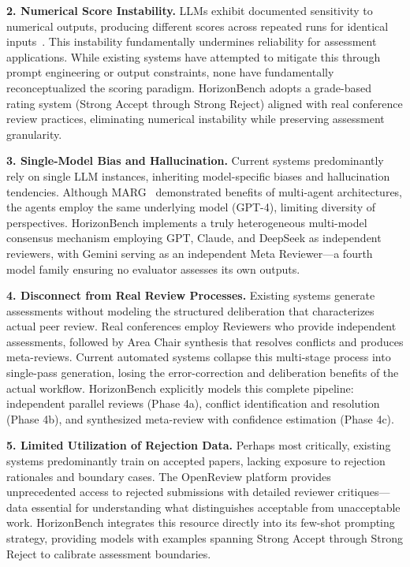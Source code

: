 \textbf{2. Numerical Score Instability.} LLMs exhibit documented sensitivity to numerical outputs, producing different scores across repeated runs for identical inputs~\cite{zhou2024llm}. This instability fundamentally undermines reliability for assessment applications. While existing systems have attempted to mitigate this through prompt engineering or output constraints, none have fundamentally reconceptualized the scoring paradigm. HorizonBench adopts a grade-based rating system (Strong Accept through Strong Reject) aligned with real conference review practices, eliminating numerical instability while preserving assessment granularity.

\textbf{3. Single-Model Bias and Hallucination.} Current systems predominantly rely on single LLM instances, inheriting model-specific biases and hallucination tendencies. Although MARG~\cite{darcy2024marg} demonstrated benefits of multi-agent architectures, the agents employ the same underlying model (GPT-4), limiting diversity of perspectives. HorizonBench implements a truly heterogeneous multi-model consensus mechanism employing GPT, Claude, and DeepSeek as independent reviewers, with Gemini serving as an independent Meta Reviewer—a fourth model family ensuring no evaluator assesses its own outputs.

\textbf{4. Disconnect from Real Review Processes.} Existing systems generate assessments without modeling the structured deliberation that characterizes actual peer review. Real conferences employ Reviewers who provide independent assessments, followed by Area Chair synthesis that resolves conflicts and produces meta-reviews. Current automated systems collapse this multi-stage process into single-pass generation, losing the error-correction and deliberation benefits of the actual workflow. HorizonBench explicitly models this complete pipeline: independent parallel reviews (Phase 4a), conflict identification and resolution (Phase 4b), and synthesized meta-review with confidence estimation (Phase 4c).

\textbf{5. Limited Utilization of Rejection Data.} Perhaps most critically, existing systems predominantly train on accepted papers, lacking exposure to rejection rationales and boundary cases. The OpenReview platform provides unprecedented access to rejected submissions with detailed reviewer critiques—data essential for understanding what distinguishes acceptable from unacceptable work. HorizonBench integrates this resource directly into its few-shot prompting strategy, providing models with examples spanning Strong Accept through Strong Reject to calibrate assessment boundaries.

